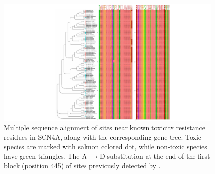 \documentclass{article}
\begin{document}
\begin{figure}[h!]
    \centering
    \includegraphics[width=\textwidth]{figures/Fig3_final.pdf}
    \caption{Multiple sequence alignment of sites near known toxicity resistance residues in SCN4A, along with the corresponding gene tree. Toxic species are marked with salmon colored dot, while non-toxic species have green triangles. The A $\rightarrow$D substitution at the end of the first block (position 445) of sites previously detected by \cite{tarvin2016convergent}.}
    \label{fig:my_label}
\end{figure}
\clearpage
\end{document}
